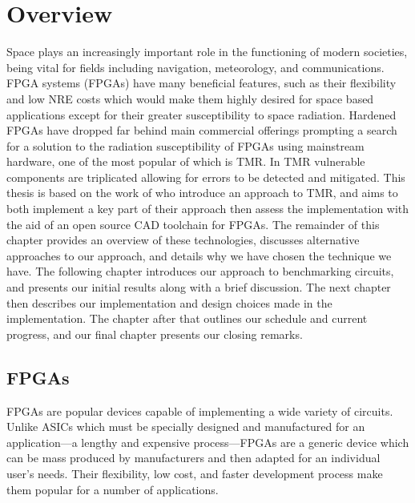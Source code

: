 \documentclass[12pt,final,oneside]{memoir} %
\begin{document}
\section{Overview}
Space plays an increasingly important role in the functioning of modern societies, being vital for fields including navigation, meteorology, and communications\cite{OECDSpace}. \acl{FPGA} systems (\acsp{FPGA}) have many beneficial features, such as their flexibility and low \ac{NRE} costs which would make them highly desired for space based applications except for their greater susceptibility to space radiation. Hardened \acp{FPGA} have dropped far behind main commercial offerings prompting a search for a solution to the radiation susceptibility of \acp{FPGA} using mainstream hardware\cite{VFPGATMR}, one of the most popular of which is \ac{TMR}. In \ac{TMR} vulnerable components are triplicated allowing for errors to be detected and mitigated. This thesis is based on the work of\cite{DiesselChange} who introduce an approach to \ac{TMR}, and aims to both implement a key part of their approach then assess the implementation with the aid of an open source \ac{CAD} toolchain for \acp{FPGA}.
The remainder of this chapter provides an overview of these technologies, discusses alternative approaches to our approach, and details why we have chosen the technique we have. The following chapter introduces our approach to benchmarking circuits, and presents our initial results along with a brief discussion. The next chapter then describes our implementation and design choices made in the implementation. The chapter after that outlines our schedule and current progress, and our final chapter presents our closing remarks.
\acresetall
\subsection{\acsp{FPGA}}
\acp{FPGA} are popular devices capable of implementing a wide variety of circuits. Unlike \acp{ASIC} which must be specially designed and manufactured for an application---a lengthy and expensive process---\acp{FPGA} are a generic device which can be mass produced by manufacturers and then adapted for an individual user's needs. Their flexibility, low cost, and faster development process make them popular for a number of applications.
\end{document}
